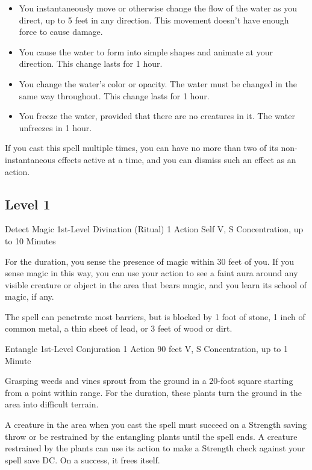 {\begin{itemize}
	\item You instantaneously move or otherwise change the flow of the water as you direct, up to 5 feet in any direction. This movement doesn’t have enough force to cause damage.
	\item You cause the water to form into simple shapes and animate at your direction. This change lasts for 1 hour.
	\item You change the water’s color or opacity. The water must be changed in the same way throughout. This change lasts for 1 hour.
	\item You freeze the water, provided that there are no creatures in it. The water unfreezes in 1 hour.
\end{itemize}
If you cast this spell multiple times, you can have no more than two of its non-instantaneous effects active at a time, and you can dismiss such an effect as an action.

\subsection*{Level 1}

\DndSpellHeader
  {Detect Magic}
  {1st-Level Divination (Ritual)}
  {1 Action}
  {Self}
  {V, S}
  {Concentration, up to 10 Minutes}

For the duration, you sense the presence of magic within 30 feet of you. If you sense magic in this way, you can use your action to see a faint aura around any visible creature or object in the area that bears magic, and you learn its school of magic, if any.

The spell can penetrate most barriers, but is blocked by 1 foot of stone, 1 inch of common metal, a thin sheet of lead, or 3 feet of wood or dirt.

\DndSpellHeader
  {Entangle}
  {1st-Level Conjuration}
  {1 Action}
  {90 feet}
  {V, S}
  {Concentration, up to 1 Minute}

Grasping weeds and vines sprout from the ground in a 20-foot square starting from a point within range. For the duration, these plants turn the ground in the area into difficult terrain.

A creature in the area when you cast the spell must succeed on a Strength saving throw or be restrained by the entangling plants until the spell ends. A creature restrained by the plants can use its action to make a Strength check against your spell save DC. On a success, it frees itself.

}
